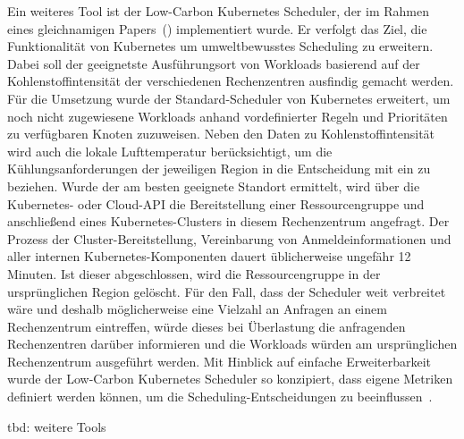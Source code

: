 Ein weiteres Tool ist der Low-Carbon Kubernetes Scheduler, der im Rahmen eines gleichnamigen Papers~(\cite{James.}) implementiert wurde.
Er verfolgt das Ziel, die Funktionalität von Kubernetes um umweltbewusstes Scheduling zu erweitern.
Dabei soll der geeignetste Ausführungsort von Workloads basierend auf der Kohlenstoffintensität der verschiedenen Rechenzentren ausfindig gemacht werden.
Für die Umsetzung wurde der Standard-Scheduler von Kubernetes erweitert, um noch nicht zugewiesene Workloads anhand vordefinierter Regeln und Prioritäten zu verfügbaren Knoten zuzuweisen.
Neben den Daten zu Kohlenstoffintensität wird auch die lokale Lufttemperatur berücksichtigt, um die Kühlungsanforderungen der jeweiligen Region in die Entscheidung mit ein zu beziehen.
Wurde der am besten geeignete Standort ermittelt, wird über die Kubernetes- oder Cloud-\ac{API} die Bereitstellung einer Ressourcengruppe und anschließend eines Kubernetes-Clusters in diesem Rechenzentrum angefragt.
Der Prozess der Cluster-Bereitstellung, Vereinbarung von Anmeldeinformationen und aller internen Kubernetes-Komponenten dauert üblicherweise ungefähr 12 Minuten.
Ist dieser abgeschlossen, wird die Ressourcengruppe in der ursprünglichen Region gelöscht.
Für den Fall, dass der Scheduler weit verbreitet wäre und deshalb möglicherweise eine Vielzahl an Anfragen an einem Rechenzentrum eintreffen, würde dieses bei Überlastung die anfragenden Rechenzentren darüber informieren und die Workloads würden am ursprünglichen Rechenzentrum ausgeführt werden.
Mit Hinblick auf einfache Erweiterbarkeit wurde der Low-Carbon Kubernetes Scheduler so konzipiert, dass eigene Metriken definiert werden können, um die Scheduling-Entscheidungen zu beeinflussen~\cite{James.}.

tbd: weitere Tools

